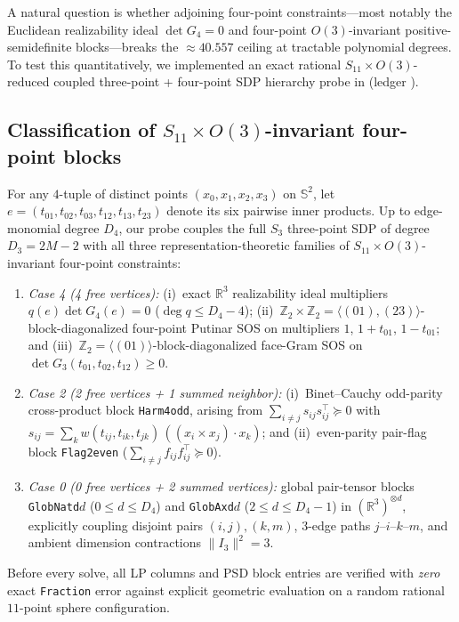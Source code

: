\documentclass[11pt,reqno]{amsart}
\renewcommand{\_}{\origunderscore\allowbreak}
\theoremstyle{definition}
\newcommand{\R}{\mathbb{R}}
\newcommand{\Z}{\mathbb{Z}}
\newcommand{\Sph}{\mathbb{S}^2}
\begin{document}
A natural question is whether adjoining four-point constraints---most notably the Euclidean realizability ideal $\det G_4 = 0$ and four-point $O(3)$-invariant positive-semidefinite blocks---breaks the $\approx 40.557$ ceiling at tractable polynomial degrees.
To test this quantitatively, we implemented an exact rational $S_{11} \times O(3)$-reduced coupled three-point + four-point SDP hierarchy probe in  (ledger ).

\subsection{Classification of \texorpdfstring{$S_{11} \times O(3)$}{S11 x O(3)}-invariant four-point blocks}\label{subsec:4pt-blocks}
For any $4$-tuple of distinct points $(x_0, x_1, x_2, x_3)$ on $\Sph$, let $e = (t_{01}, t_{02}, t_{03}, t_{12}, t_{13}, t_{23})$ denote its six pairwise inner products.
Up to edge-monomial degree $D_4$, our probe couples the full $S_3$ three-point SDP of degree $D_3 = 2M - 2$ with all three representation-theoretic families of $S_{11} \times O(3)$-invariant four-point constraints:
\begin{enumerate}[leftmargin=2.2em]
  \item \emph{Case 4 (4 free vertices):}
  (i)~exact $\R^3$ realizability ideal multipliers $q(e)\det G_4(e) = 0$ ($\deg q \le D_4 - 4$);
  (ii)~$\Z_2 \times \Z_2 = \langle(01),(23)\rangle$-block-diagonalized four-point Putinar SOS on multipliers $1$, $1+t_{01}$, $1-t_{01}$; and
  (iii)~$\Z_2 = \langle(01)\rangle$-block-diagonalized face-Gram SOS on $\det G_3(t_{01}, t_{02}, t_{12}) \ge 0$.
  \item \emph{Case 2 (2 free vertices + 1 summed neighbor):}
  (i)~Binet--Cauchy odd-parity cross-product block \texttt{Harm4\_odd}, arising from $\sum_{i\ne j} s_{ij} s_{ij}^\top \succeq 0$ with $s_{ij} = \sum_k w(t_{ij}, t_{ik}, t_{jk})\,((x_i \times x_j)\cdot x_k)$; and
  (ii)~even-parity pair-flag block \texttt{Flag2\_even} ($\sum_{i \ne j} f_{ij} f_{ij}^\top \succeq 0$).
  \item \emph{Case 0 (0 free vertices + 2 summed vertices):}
  global pair-tensor blocks \texttt{GlobNat\_d}$d$ ($0 \le d \le D_4$) and \texttt{GlobAx\_d}$d$ ($2 \le d \le D_4 - 1$) in $(\R^3)^{\otimes d}$, explicitly coupling disjoint pairs $(i,j),(k,m)$, $3$-edge paths $j\text{--}i\text{--}k\text{--}m$, and ambient dimension contractions $\|I_3\|^2 = 3$.
\end{enumerate}
Before every solve, all LP columns and PSD block entries are verified with \emph{zero} exact \texttt{Fraction} error against explicit geometric evaluation on a random rational $11$-point sphere configuration.
\end{document}
